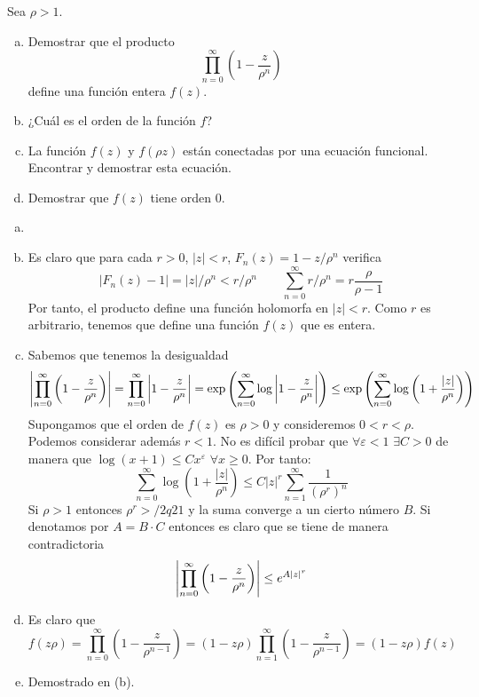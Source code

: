 \documentclass[twoside]{article}
\begin{document}
\begin{ejercicio}{3}
Sea $\rho>1$.
\begin{enumerate}[(a)]
\item Demostrar que el producto
$$
\prod_{n=0}^\infty \left(1-\frac{z}{\rho^n}\right) 
$$
define una función entera $f(z)$.
\item ¿Cuál es el orden de la función $f$?
\item La función $f(z)$ y $f(\rho z)$ están conectadas por una ecuación funcional. Encontrar y demostrar esta ecuación.
\item Demostrar que $f(z)$ tiene orden $0$.
\end{enumerate}
\end{ejercicio}
\begin{solucion}
\begin{enumerate}[(a)]
\item[]
\item Es claro que para cada $r>0$, $|z|< r$, $F_n(z)=1-z/\rho^n$ verifica 
$$
|F_n(z)-1| = |z|/\rho^n < r/\rho^n \qquad \sum_{n=0}^\infty r/\rho^n = r \frac{\rho}{\rho-1}
$$
Por tanto, el producto define una función holomorfa en $|z|<r$. Como $r$ es arbitrario, tenemos que define una función $f(z)$ que es entera.
\item Sabemos que tenemos la desigualdad
$$
\left\lvert\prod_{n=0}^\infty \left(1-\frac{z}{\rho^n}\right)\right\rvert  = \prod_{n=0}^\infty \left\lvert1-\frac{z}{\rho^n}\right\rvert = \exp\left(\sum_{n=0}^\infty \log \left\lvert1-\frac{z}{\rho^n}\right\rvert\right) \leq  \exp\left(\sum_{n=0}^\infty \log \left({1+\frac{|z|}{\rho^n}}\right)\right)
$$
Supongamos que el orden de $f(z)$ es $\rho>0$ y consideremos $0<r<\rho$. Podemos considerar además $r<1$. No es difícil probar que $\forall \varepsilon < 1$ $\exists C >0$ de manera que $\log(x+1)\leq C x^\varepsilon$ $\forall x \geq 0$. Por tanto:
$$
\sum_{n=0}^\infty \log \left({1+\frac{|z|}{\rho^n}}\right) \leq C |z|^{r}\sum_{n=1}^\infty \frac{1}{(\rho^{r})^n}
$$
Si $\rho>1$ entonces $\rho^{r}>/2q21$ y la suma converge a un cierto número $B$. Si denotamos por $A = B\cdot C$ entonces es claro que se tiene de manera contradictoria
$$
\left\lvert\prod_{n=0}^\infty \left(1-\frac{z}{\rho^n}\right)\right\rvert \leq e^{A|z|^{r}}
$$
\item Es claro que 
$$
f(z\rho) = \prod_{n=0}^\infty  \left(1-\frac{z}{\rho^{n-1}}\right)  = (1-z\rho)\prod_{n=1}^\infty  \left(1-\frac{z}{\rho^{n-1}}\right)  = (1-z\rho)f(z)
$$
\item Demostrado en (b).
\end{enumerate}
\end{solucion}
\end{document}
